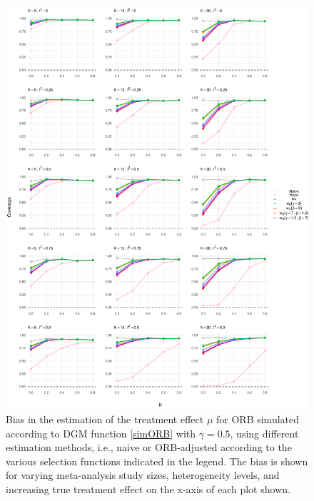 \documentclass[twocolumn]{article}\usepackage[]{graphicx}\usepackage[]{xcolor}
\makeatletter
\def\maxwidth{ %
  \ifdim\Gin@nat@width>\linewidth
    \linewidth
  \else
    \Gin@nat@width
  \fi
}
\makeatother
\begin{document}
\begin{figure}[!hbt]
\centering
\caption{Bias in the estimation of the treatment effect $\mu$ for ORB simulated according to DGM function \eqref{simORB} with $\gamma=0.5$, using different estimation methods, i.e., naive or ORB-adjusted according to the various selection functions indicated in the legend. The bias is shown for varying meta-analysis study sizes, heterogeneity levels, and increasing true treatment effect on the x-axis of each plot shown.\\[0.5em]}


{\centering \includegraphics[width=\maxwidth]{figures/plots-unnamed-chunk-6-1} 

}



\label{res2}
\end{figure}

\end{document}
